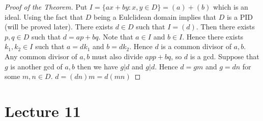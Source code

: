 \documentclass[twoside, openright, fontsize=10pt, headings=big]{scrbook}
\begin{document}
\begin{proof}[Proof of the Theorem]
    Put $I=\{ax+by:x,y\in D\}=(a)+(b)$ which is an ideal. Using the fact that $D$ being a Eulclidean domain implies that $D$ is a PID (will be proved later). There exists $d\in D$ such that $I=(d)$. Then there exists $p,q\in D$ such that $d=ap+bq$. Note that $a\in I$ and $b\in I$. Hence there exists $k_1,k_2\in I$ such that $a=dk_1$ and $b=dk_2$. Hence $d$ is a common divisor of $a,b$. Any common divisor of $a,b$ must also divide $app+bq$, so $d$ is a gcd. Suppose that $g$ is another gcd of $a,b$ then we have $g\vert d$ and $g\vert d$. Hence $d=gm$ and $g=dn$ for some $m,n\in D$. $d=(dn)m=d(mn)$
\end{proof}

\chapter{Lecture 11}
\end{document}

